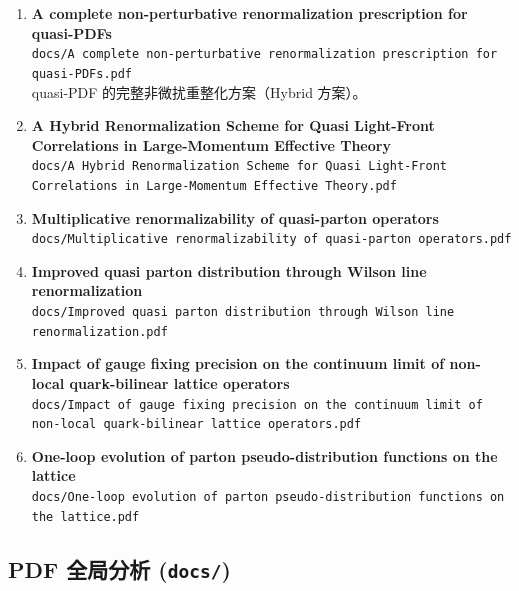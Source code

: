 \documentclass[12pt,a4paper]{ctexart}
\begin{document}
\begin{enumerate}
    \item \textbf{A complete non-perturbative renormalization prescription for quasi-PDFs} \\
    \texttt{docs/A complete non-perturbative renormalization prescription for quasi-PDFs.pdf} \\
    quasi-PDF 的完整非微扰重整化方案（Hybrid 方案）。

    \item \textbf{A Hybrid Renormalization Scheme for Quasi Light-Front Correlations in Large-Momentum Effective Theory} \\
    \texttt{docs/A Hybrid Renormalization Scheme for Quasi Light-Front Correlations in Large-Momentum Effective Theory.pdf}

    \item \textbf{Multiplicative renormalizability of quasi-parton operators} \\
    \texttt{docs/Multiplicative renormalizability of quasi-parton operators.pdf}

    \item \textbf{Improved quasi parton distribution through Wilson line renormalization} \\
    \texttt{docs/Improved quasi parton distribution through Wilson line renormalization.pdf}

    \item \textbf{Impact of gauge fixing precision on the continuum limit of non-local quark-bilinear lattice operators} \\
    \texttt{docs/Impact of gauge fixing precision on the continuum limit of non-local quark-bilinear lattice operators.pdf}

    \item \textbf{One-loop evolution of parton pseudo-distribution functions on the lattice} \\
    \texttt{docs/One-loop evolution of parton pseudo-distribution functions on the lattice.pdf}
\end{enumerate}

\subsection{PDF 全局分析 (\texttt{docs/})}
\end{document}
